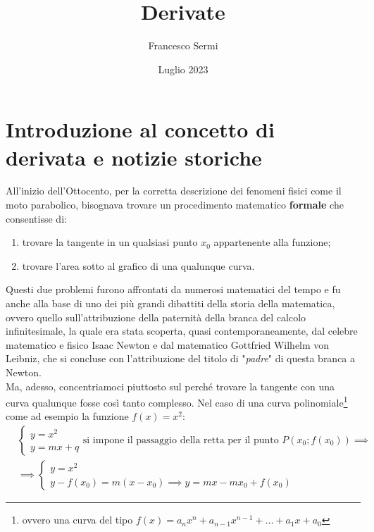 \documentclass{report}
\title{\Huge{Derivate}}
\author{\huge{Francesco Sermi}}
\date{Luglio 2023}
\begin{document}
\maketitle
\newpage%
\cleardoublepage
{}
\tableofcontents
\pagebreak

\chapter{Introduzione al concetto di derivata e notizie storiche}

All'inizio dell'Ottocento, per la corretta descrizione dei fenomeni fisici come il moto parabolico, bisognava trovare un procedimento matematico \textbf{formale} che consentisse di:
\begin{enumerate}[label=\protect\circled{\arabic*}]
	\item trovare la tangente in un qualsiasi punto $x_0$ appartenente alla funzione;
	\item trovare l'area sotto al grafico di una qualunque curva.
\end{enumerate}
Questi due problemi furono affrontati da numerosi matematici del tempo e fu anche alla base di uno dei più grandi dibattiti della storia della matematica, ovvero quello sull'attribuzione della paternità della branca del calcolo infinitesimale, la quale era stata scoperta, quasi contemporaneamente, dal celebre matematico e fisico Isaac Newton e dal matematico Gottfried Wilhelm von Leibniz, che si concluse con l'attribuzione del titolo di "\emph{padre}" di questa branca a Newton. \\
Ma, adesso, concentriamoci piuttosto sul perché trovare la tangente con una curva qualunque fosse così tanto complesso. Nel caso di una curva polinomiale\footnote{ovvero una curva del tipo $f(x)=a_nx^n + a_{n-1}x^{n-1} + \ldots + a_1x + a_0$} come ad esempio la funzione $f(x) = x^2$:
\begin{align*}
&\begin{cases}
	y = x^2 \\
	y = mx + q
\end{cases}
\text{si impone il passaggio della retta per il punto $P(x_0;f(x_0))$} \implies \\
&\implies \begin{cases}
	y = x^2 \\
	y - f(x_0) = m(x - x_0) \implies y = mx - mx_0 + f(x_0)
\end{cases}
\end{align*}
\end{document}
